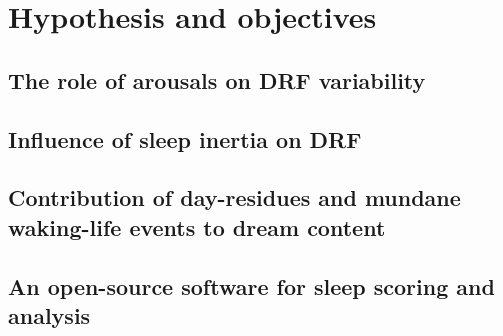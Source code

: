 %
\chapter{Hypothesis and objectives}
\label{sec:problematic}


\section{The role of arousals on DRF variability}
\label{sec:problematic:arousals}

\section{Influence of sleep inertia on DRF}
\label{sec:problematic:inertia}

\section{Contribution of day-residues and mundane waking-life events to dream content}
\label{sec:problematic:wle}

\section{An open-source software for sleep scoring and analysis}
\label{sec:problematic:software}
